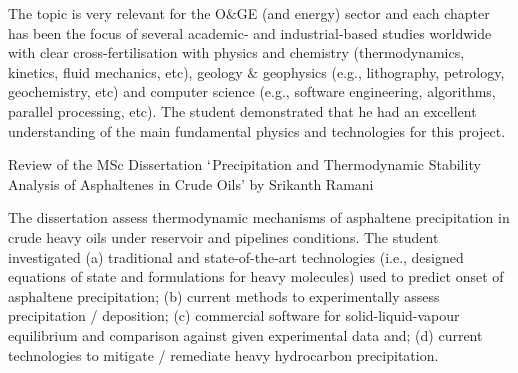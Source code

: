 \documentclass[14pt,twoside]{report}
\begin{document}
The topic is very relevant for the O$\&$GE (and energy) sector and each chapter has been the focus of several academic- and industrial-based studies worldwide with clear cross-fertilisation with physics and chemistry (thermodynamics, kinetics, fluid mechanics, etc), geology $\&$ geophysics (e.g., lithography, petrology, geochemistry, etc) and computer science (e.g., software engineering, algorithms, parallel processing, etc).  The student demonstrated that he had an excellent understanding of the main fundamental physics and technologies for this project.

\clearpage



\bigskip

\begin{center}
{\Large Review of the MSc Dissertation $\lq$Precipitation and Thermodynamic Stability Analysis of Asphaltenes in Crude Oils' by Srikanth Ramani}
\end{center}

\medskip

The dissertation assess thermodynamic mechanisms of asphaltene precipitation in crude heavy oils under reservoir and pipelines conditions. The student investigated (a) traditional and state-of-the-art technologies (i.e., designed equations of state and formulations for heavy molecules) used to predict onset of asphaltene precipitation; (b) current methods to experimentally assess precipitation / deposition; (c) commercial software for solid-liquid-vapour equilibrium and comparison against given experimental data and; (d) current technologies to mitigate / remediate heavy hydrocarbon precipitation.
\end{document}
